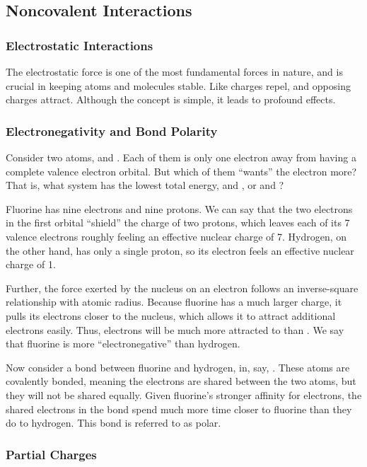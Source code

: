 \subsection{Noncovalent Interactions}
\subsubsection{Electrostatic Interactions}

The electrostatic force is one of the most fundamental forces in nature, and is crucial in keeping atoms and molecules stable. Like charges repel, and opposing charges attract. Although the concept is simple, it leads to profound effects.

\subsubsection{Electronegativity and Bond Polarity}

Consider two atoms,  and . Each of them is only one electron away from having a complete valence electron orbital. But which of them ``wants'' the electron more? That is, what system has the lowest total energy,  and , or  and ?

Fluorine has nine electrons and nine protons. We can say that the two electrons in the first orbital ``shield'' the charge of two protons, which leaves each of its \num{7} valence electrons roughly feeling an effective nuclear charge of \num{7}. Hydrogen, on the other hand, has only a single proton, so its electron feels an effective nuclear charge of \num{1}.

Further, the force exerted by the nucleus on an electron follows an inverse-square relationship with atomic radius. Because fluorine has a much larger charge, it pulls its electrons closer to the nucleus, which allows it to attract additional electrons easily. Thus, electrons will be much more attracted to  than . We say that fluorine is more ``electronegative'' than hydrogen.

Now consider a bond between fluorine and hydrogen, in, say, . These atoms are covalently bonded, meaning the electrons are shared between the two atoms, but they will not be shared equally. Given fluorine's stronger affinity for electrons, the shared electrons in the bond spend much more time closer to fluorine than they do to hydrogen. This bond is referred to as polar.

\subsubsection{Partial Charges}

